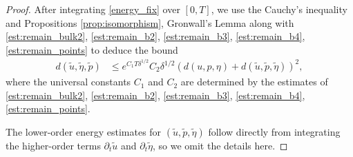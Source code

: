 \documentclass[letterpaper,reqno,10pt,twoside]{amsart}
\theoremstyle{definition}
\theoremstyle{remark}
\begin{document}
\begin{proof}
			After integrating \eqref{energy_fix} over $[0,T]$, we use the Cauchy's inequality and Propositions \eqref{prop:isomorphism}, Gronwall's Lemma along with \eqref{est:remain_bulk2}, \eqref{est:remain_b2}, \eqref{est:remain_b3}, \eqref{est:remain_b4}, \eqref{est:remain_points} to deduce the bound
			\begin{equation}\label{est:contract_1}
				\begin{aligned}
					d(\tilde{u},\tilde{\eta},\tilde{p})&\le e^{C_1T\delta^{1/2}}C_2\delta^{1/2}(d(u,p,\eta)+d(\tilde{u},\tilde{p},\tilde{\eta}))^{2},
				\end{aligned}
			\end{equation}
			where the universal constants $C_1$ and $C_2$ are determined by the estimates of  \eqref{est:remain_bulk2}, \eqref{est:remain_b2}, \eqref{est:remain_b3}, \eqref{est:remain_b4}, \eqref{est:remain_points}.
			
			The lower-order energy estimates for $(\tilde{u},\tilde{p},\tilde{\eta})$ follow directly from integrating the higher-order terms $\partial_t \tilde{u}$ and $\partial_t \tilde{\eta}$, so we omit the details here.
			
			

\end{proof}
\end{document}
